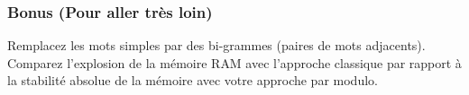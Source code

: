\subsubsection*{Bonus (Pour aller très loin)}
Remplacez les mots simples par des bi-grammes (paires de mots adjacents). Comparez l'explosion de la mémoire RAM avec l'approche classique par rapport à la stabilité absolue de la mémoire avec votre approche par modulo.